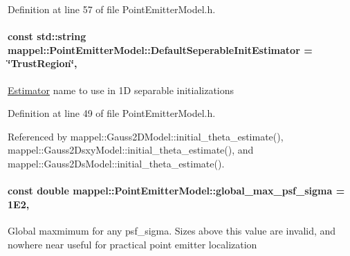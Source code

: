 Definition at line 57 of file Point\+Emitter\+Model.\+h.

\paragraph[{\texorpdfstring{Default\+Seperable\+Init\+Estimator}{DefaultSeperableInitEstimator}}]{\setlength{\rightskip}{0pt plus 5cm}const std\+::string mappel\+::\+Point\+Emitter\+Model\+::\+Default\+Seperable\+Init\+Estimator = \char`\"{}Trust\+Region\char`\"{}\hspace{0.3cm}{\ttfamily [static]}, {\ttfamily [inherited]}}\hypertarget{classmappel_1_1PointEmitterModel_ad8c3dc629d75d22f25855a5f1ba8729f}{}\label{classmappel_1_1PointEmitterModel_ad8c3dc629d75d22f25855a5f1ba8729f}
\hyperlink{classmappel_1_1Estimator}{Estimator} name to use in 1D separable initializations 

Definition at line 49 of file Point\+Emitter\+Model.\+h.



Referenced by mappel\+::\+Gauss2\+D\+Model\+::initial\+\_\+theta\+\_\+estimate(), mappel\+::\+Gauss2\+Dsxy\+Model\+::initial\+\_\+theta\+\_\+estimate(), and mappel\+::\+Gauss2\+Ds\+Model\+::initial\+\_\+theta\+\_\+estimate().

\paragraph[{\texorpdfstring{global\+\_\+max\+\_\+psf\+\_\+sigma}{global_max_psf_sigma}}]{\setlength{\rightskip}{0pt plus 5cm}const double mappel\+::\+Point\+Emitter\+Model\+::global\+\_\+max\+\_\+psf\+\_\+sigma = 1\+E2\hspace{0.3cm}{\ttfamily [static]}, {\ttfamily [inherited]}}\hypertarget{classmappel_1_1PointEmitterModel_a5e79dba8966c25c4e9c675cd1a2cab70}{}\label{classmappel_1_1PointEmitterModel_a5e79dba8966c25c4e9c675cd1a2cab70}
Global maxmimum for any psf\+\_\+sigma. Sizes above this value are invalid, and nowhere near useful for practical point emitter localization 

